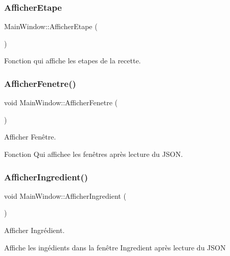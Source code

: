 \subsubsection{\texorpdfstring{Afficher\+Etape}{AfficherEtape}}
{\footnotesize\ttfamily Main\+Window\+::\+Afficher\+Etape (\begin{DoxyParamCaption}{ }\end{DoxyParamCaption})\hspace{0.3cm}{\ttfamily [slot]}}



Fonction qui affiche les etapes de la recette. 

\mbox{\label{class_main_window_aad6ceb17a20cccdc88050996600e9616}} 
\subsubsection{\texorpdfstring{Afficher\+Fenetre()}{AfficherFenetre()}}
{\footnotesize\ttfamily void Main\+Window\+::\+Afficher\+Fenetre (\begin{DoxyParamCaption}{ }\end{DoxyParamCaption})}



Afficher Fenêtre. 

Fonction Qui affichee les fenêtres après lecture du J\+S\+ON. \mbox{\label{class_main_window_ad4059abf16eb904f988371b3791002bf}} 
\subsubsection{\texorpdfstring{Afficher\+Ingredient()}{AfficherIngredient()}}
{\footnotesize\ttfamily void Main\+Window\+::\+Afficher\+Ingredient (\begin{DoxyParamCaption}{ }\end{DoxyParamCaption})}



Afficher Ingrédient. 

Affiche les ingédients dans la fenêtre Ingredient après lecture du J\+S\+ON \mbox{\label{class_main_window_aeddbbb22621e412b4749d331c1d45001}} 
